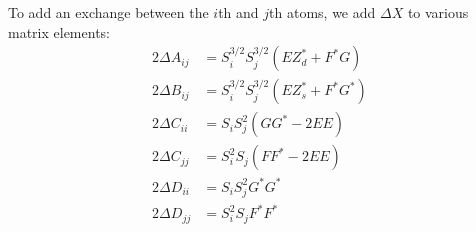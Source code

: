 \documentclass{article}
\begin{document}
To add an exchange between the $i$th and $j$th atoms, we add $\Delta X$ to various matrix elements:
\begin{align}
    2\Delta A_{ij} &= S_i^{3/2} S_j^{3/2} \left( EZ_d^* + F^*G   \right) \\
    2\Delta B_{ij} &= S_i^{3/2} S_j^{3/2} \left( EZ_s^* + F^*G^* \right) \\
    2\Delta C_{ii} &= S_i S_j^2 (G G^* - 2 E E) \\
    2\Delta C_{jj} &= S_i^2 S_j (F F^* - 2 E E) \\
    2\Delta D_{ii} &= S_i S_j^2 G^* G^* \\
    2\Delta D_{jj} &= S_i^2 S_j F^* F^*
\end{align}
\end{document}
